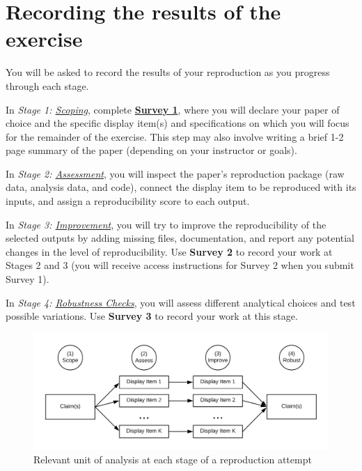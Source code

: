 \documentclass[]{book}
\begin{document}
\hypertarget{recording-the-results-of-the-exercise}{%
\section*{Recording the results of the exercise}\label{recording-the-results-of-the-exercise}}

You will be asked to record the results of your reproduction as you progress through each stage.

In \emph{Stage 1: \protect\hyperlink{scoping}{Scoping}}, complete \textbf{\href{https://berkeley.qualtrics.com/jfe/form/SV_2bO83uJvU9ZiTXv}{Survey 1}}, where you will declare your paper of choice and the specific display item(s) and specifications on which you will focus for the remainder of the exercise. This step may also involve writing a brief 1-2 page summary of the paper (depending on your instructor or goals).

In \emph{Stage 2: \protect\hyperlink{assessment}{Assessment}}, you will inspect the paper's reproduction package (raw data, analysis data, and code), connect the display item to be reproduced with its inputs, and assign a reproducibility score to each output.

In \emph{Stage 3: \protect\hyperlink{improvements}{Improvement}}, you will try to improve the reproducibility of the selected outputs by adding missing files, documentation, and report any potential changes in the level of reproducibility. Use \textbf{Survey 2} to record your work at Stages 2 and 3 (you will receive access instructions for Survey 2 when you submit Survey 1).

In \emph{Stage 4: \protect\hyperlink{robust}{Robustness Checks}}, you will assess different analytical choices and test possible variations. Use \textbf{Survey 3} to record your work at this stage.

\begin{figure}
\includegraphics[width=1\linewidth]{unit-of-analysis} \caption{Relevant unit of analysis at each stage of a reproduction attempt}\label{fig:stages-unit}
\end{figure}
\end{document}
